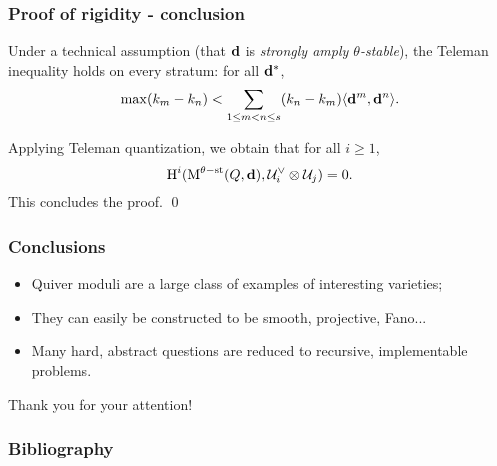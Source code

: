 \documentclass{beamer}
\begin{document}
\begin{frame}
    \frametitle{Proof of rigidity - conclusion}
Under a technical assumption (that $\mathbf{d}$ is \emph{strongly amply $\theta$-stable}),
the Teleman inequality holds on every stratum: for all $\mathbf{d}^*$,
\[\max(k_m - k_n) < \sum_{1 \leq m < n \leq s} (k_n - k_m)\langle \mathbf{d}^m, \mathbf{d}^n \rangle.\] \pause

Applying Teleman quantization, we obtain that for all $i \geq 1$,
\[ \operatorname{H}^i(\operatorname{M}^{\theta-\mathrm{st}}(Q, \mathbf{d}), \mathcal{U}^{\vee}_i \otimes \mathcal{U}_j) = 0. \]
This concludes the proof. \qed \pause
\end{frame}
\begin{frame}
    \frametitle{Conclusions}
\begin{itemize}
\item Quiver moduli are a large class of examples of interesting varieties; \pause
\item They can easily be constructed to be smooth, projective, Fano... \pause 
\item Many hard, abstract questions are reduced to recursive, implementable problems.
\end{itemize}
\end{frame}
\begin{frame}
\begin{center}
    Thank you for your attention!
\end{center}
\end{frame}

\begin{frame}
    \frametitle{Bibliography}
    \printbibliography
\end{frame}
\end{document}
